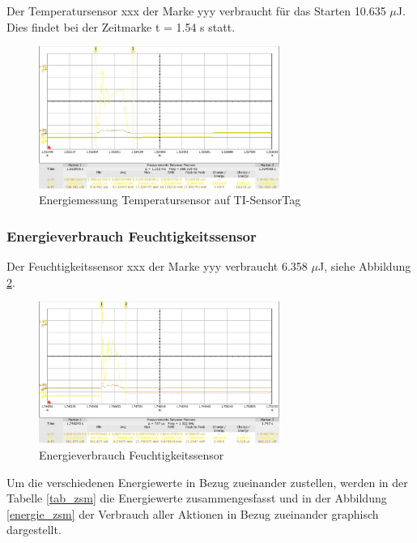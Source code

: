 Der Temperatursensor xxx der Marke yyy verbraucht für das Starten 10.635 $\mu$J. Dies findet bei der Zeitmarke t = 1.54 s statt.

\begin{figure}[ht]
  \includegraphics[width=0.7\textwidth]{3Vorgehen/imag/tempSensor.png}
  \caption{Energiemessung Temperatursensor auf TI-SensorTag}
  \label{energie_tempsensor}
\end{figure}

\subsubsection*{Energieverbrauch Feuchtigkeitssensor}

Der Feuchtigkeitssensor xxx der Marke yyy verbraucht 6.358 $\mu$J, siehe Abbildung \ref{energie_humidity}.

\begin{figure}[ht]
  \includegraphics[width=0.7\textwidth]{3Vorgehen/imag/Humidity.png}
  \caption{Energieverbrauch Feuchtigkeitssensor}
  \label{energie_humidity}
\end{figure}

\enlargethispage*{15cm}

\clearpage
Um die verschiedenen Energiewerte in Bezug zueinander zustellen, werden in der Tabelle \ref{tab_zsm} die Energiewerte zusammengesfasst und in der Abbildung \ref{energie_zsm} der Verbrauch aller Aktionen in Bezug zueinander graphisch dargestellt. 

